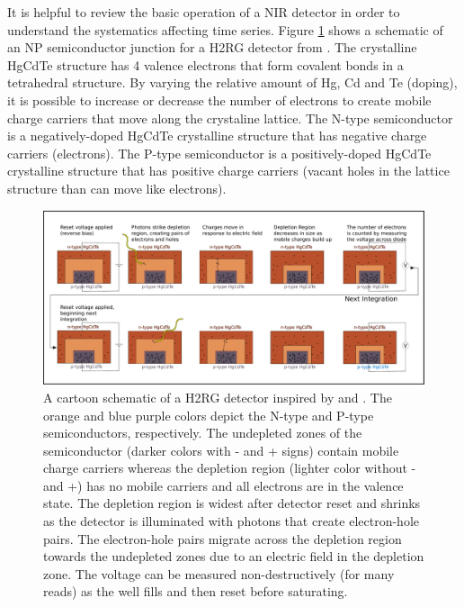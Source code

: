 \documentclass{aastex62}
\begin{document}
It is helpful to review the basic operation of a NIR detector \citep[e.g.][]{rieke2007irDetectorReview} in order to understand the systematics affecting time series.
Figure \ref{fig:npSchematic} shows a schematic of an NP semiconductor junction for a H2RG detector from \citet{smith2008imgPersistence}.
The crystalline HgCdTe structure has 4 valence electrons that form covalent bonds in a tetrahedral structure.
By varying the relative amount of Hg, Cd and Te (doping), it is possible to increase or decrease the number of electrons to create mobile charge carriers that move along the crystaline lattice.
The N-type semiconductor is a negatively-doped HgCdTe crystalline structure that has negative charge carriers (electrons).
The P-type semiconductor is a positively-doped HgCdTe crystalline structure that has positive charge carriers (vacant holes in the lattice structure than can move like electrons).

\begin{figure}[!hbtp]
\centering
\includegraphics[width=.99\columnwidth]{ideal_photodiode.pdf}
\caption{A cartoon schematic of a H2RG detector inspired by \citet{smith2008imgPersistence} and \citet{tulloch2018persistenceH2RG}.
The orange and blue purple colors depict the N-type and P-type semiconductors, respectively.
The undepleted zones of the semiconductor (darker colors with - and + signs) contain mobile charge carriers whereas the depletion region (lighter color without - and +) has no mobile carriers and all electrons are in the valence state.
The depletion region is widest after detector reset and shrinks as the detector is illuminated with photons that create electron-hole pairs.
The electron-hole pairs migrate across the depletion region towards the undepleted zones due to an electric field in the depletion zone.
The voltage can be measured non-destructively (for many reads) as the well fills and then reset before saturating.}\label{fig:npSchematic}
\end{figure}
\end{document}
